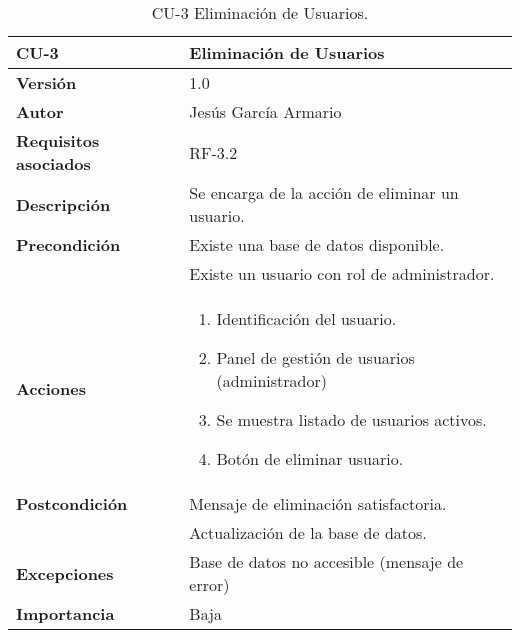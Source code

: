 \begin{table}[p]
	\centering
	\begin{tabularx}{\linewidth}{ p{} p{} }
		\toprule
		\textbf{CU-3}    & \textbf{Eliminación de Usuarios}\\
		\toprule
		\textbf{Versión}              & 1.0    \\
		\textbf{Autor}                & Jesús García Armario \\
		\textbf{Requisitos asociados} & RF-3.2 \\
		\textbf{Descripción}          & Se encarga de la acción de eliminar un usuario. \\
		\textbf{Precondición}         & Existe una base de datos disponible. \\
  & Existe un usuario con rol de administrador.\\
		\textbf{Acciones}             &
		\begin{enumerate}
			\def\labelenumi{\arabic{enumi}.}
			\tightlist
			\item Identificación del usuario.
   \item Panel de gestión de usuarios (administrador)
   \item Se muestra listado de usuarios activos.
   \item Botón de eliminar usuario.
\end{enumerate}\\
		\textbf{Postcondición}        &  Mensaje de eliminación satisfactoria. \\
  & Actualización de la base de datos.\\
		\textbf{Excepciones}          & Base de datos no accesible (mensaje de error)\\
		\textbf{Importancia}          & Baja \\
		\bottomrule
	\end{tabularx}
	\caption{CU-3 Eliminación de Usuarios.}
 \end{table}
